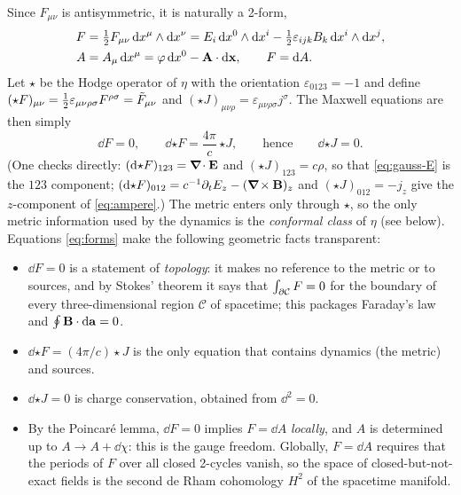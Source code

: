 Since $F_{\mu\nu}$ is antisymmetric, it is naturally a 2-form,
\begin{equation}
\begin{aligned}
F&=\tfrac12F_{\mu\nu}\,\mathrm{d} x^\mu\wedge\mathrm{d} x^\nu
=E_i\,\mathrm{d} x^0\wedge\mathrm{d} x^i-\tfrac12\varepsilon_{ijk}B_k\,\mathrm{d} x^i\wedge\mathrm{d} x^j,\\
A&=A_\mu\,\mathrm{d} x^\mu=\varphi\,\mathrm{d} x^0-\mathbf{A}\cdot\mathrm{d}\mathbf{x},\qquad F=\mathrm{d} A .
\end{aligned}
\end{equation}
Let $\star$ be the Hodge operator of $\eta$ with the orientation
$\varepsilon_{0123}=-1$ and define $(\star F)_{\mu\nu}=\tfrac12\varepsilon_{\mu\nu\rho\sigma}F^{\rho\sigma}=\tilde F_{\mu\nu}$ and
$(\star J)_{\mu\nu\rho}=\varepsilon_{\mu\nu\rho\sigma}j^\sigma$.  The Maxwell
equations are then simply
\begin{equation}\label{eq:forms}
\dd F=0,\qquad \dd{\star F}=\frac{4\pi}{c}\,{\star J},\qquad\text{hence}\qquad \dd{\star J}=0 .
\end{equation}
(One checks directly: $(\mathrm{d}{\star F})_{123}=\boldsymbol{\nabla}\!\cdot\mathbf{E}$ and
$(\star J)_{123}=c\rho$, so that \eqref{eq:gauss-E} is the $123$ component;
$(\mathrm{d}{\star F})_{012}=c^{-1}\partial_tE_z-(\boldsymbol{\nabla}\!\times\mathbf{B})_z$ and
$(\star J)_{012}=-j_z$ give the $z$-component of \eqref{eq:ampere}.)  The
metric enters only through $\star$, so the only metric information
used by the dynamics is the \emph{conformal class} of $\eta$ (see
below).  Equations \eqref{eq:forms} make the following geometric facts
transparent:
\begin{itemize}
\item $\dd F=0$ is a statement of \emph{topology}: it makes no
  reference to the metric or to sources, and by Stokes' theorem it says
  that $\int_{\partial\mathcal C}F=0$ for the boundary of every
  three-dimensional region $\mathcal C$ of spacetime; this packages
  Faraday's law and $\oint\mathbf{B}\cdot\mathrm{d}\mathbf a=0$.
\item $\dd{\star F}=(4\pi/c)\star J$ is the only equation that contains
  dynamics (the metric) and sources.
\item $\dd{\star J}=0$ is charge conservation, obtained from $\dd^2=0$.
\item By the Poincaré lemma, $\dd F=0$ implies $F=\dd A$ \emph{locally}, and
  $A$ is determined up to $A\to A+\dd\chi$: this is the gauge freedom.
  Globally, $F=\dd A$ requires that the periods of $F$ over all closed
  2-cycles vanish, so the space of closed-but-not-exact fields is the
  second de Rham cohomology $H^2$ of the spacetime manifold.
\end{itemize}

